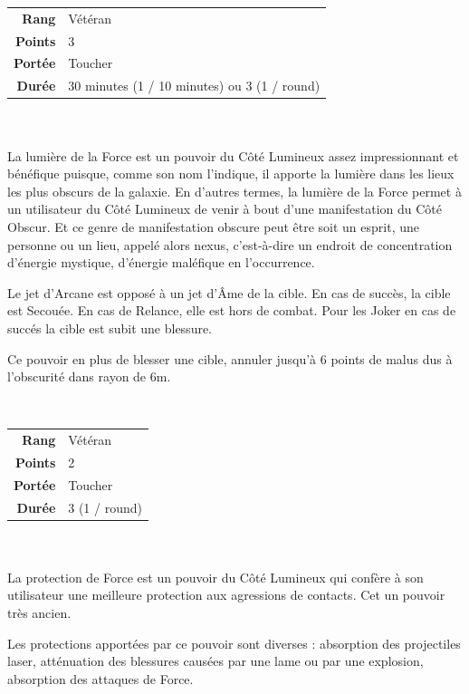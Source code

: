 \begin{description}[align=left]
        \begin{tabular}{ r l }
            \textbf{Rang}    & Vétéran \\
            \textbf{Points}  & 3 \\
            \textbf{Portée}  & Toucher \\
            \textbf{Durée}   & 30 minutes (1 / 10 minutes) ou 3 (1 / round) \\
        \end{tabular}
        \\ \\
        La lumière de la Force est un pouvoir du Côté Lumineux assez impressionnant et bénéfique puisque, comme son nom l'indique, il apporte la lumière dans les lieux les plus obscurs de la galaxie. En d'autres termes, la lumière de la Force permet à un utilisateur du Côté Lumineux de venir à bout d'une manifestation du Côté Obscur. Et ce genre de manifestation obscure peut être soit un esprit, une personne ou un lieu, appelé alors nexus, c'est-à-dire un endroit de concentration d'énergie mystique, d'énergie maléfique en l'occurrence.

        Le jet d’Arcane est opposé à un jet d’\^Ame de la cible. En cas de succès, la cible est Secouée. En cas de Relance, elle est hors de combat. Pour les Joker en cas de succés la cible est subit une blessure.

        Ce pouvoir en plus de blesser une cible, annuler jusqu’à 6 points de malus dus à l’obscurité dans rayon de 6m.
        \\

    \item [Protection de Force] ~ \\

        \begin{tabular}{ r l }
            \textbf{Rang}    & Vétéran \\
            \textbf{Points}  & 2 \\
            \textbf{Portée}  & Toucher \\
            \textbf{Durée}   & 3 (1 / round) \\
        \end{tabular}
        \\ \\
        La protection de Force est un pouvoir du Côté Lumineux qui confère à son utilisateur une meilleure protection aux agressions de contacts. Cet un pouvoir très ancien.

        Les protections apportées par ce pouvoir sont diverses : absorption des projectiles laser, atténuation des blessures causées par une lame ou par une explosion, absorption des attaques de Force.


\end{description}
